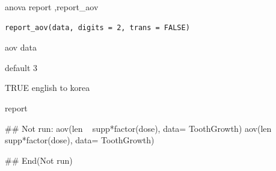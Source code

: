 \documentclass[a4paper]{book}
\begin{document}
%
\begin{Description}
anova report ,report\_aov
\end{Description}
%
\begin{Usage}
\begin{verbatim}
report_aov(data, digits = 2, trans = FALSE)
\end{verbatim}
\end{Usage}
%
\begin{Arguments}
\begin{ldescription}
\item[\code{data}] aov data

\item[\code{digits}] default 3

\item[\code{trans}] TRUE english to korea
\end{ldescription}
\end{Arguments}
%
\begin{Value}
report
\end{Value}
%
\begin{Examples}
\begin{ExampleCode}
\#\# Not run: 
aov(len ~ supp*factor(dose), data= ToothGrowth) %
aov(len ~ supp*factor(dose), data= ToothGrowth) %



## End(Not run)


\end{ExampleCode}
\end{Examples}
\end{document}
